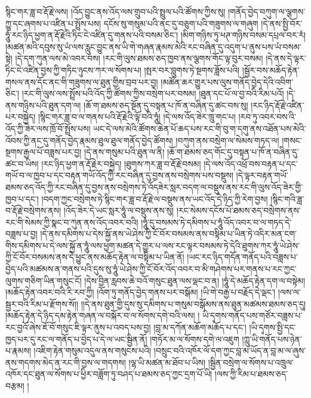 སྙིང་གར་ཟླ་བ་རྡོ་རྗེ་ལས། །འོད་བྱུང་ནས་འོད་ལས་གྲུབ་པའི་སྤྲུལ་པའི་ཚོགས་ཀྱིས་སུ། །གནོད་བྱེད་བཀུག་ལ་ལྕགས་ཀྱུ་དང་ཞགས་པ་འཛིན་པ་སྤྲོས་པས། དངོས་སུ་གསུམ་པའི་ནང་དུ་བཅུག་པའི་གཟུགས་ལ་གཞུག །དེ་ནས་སྤྱི་བོར་ཧཱུཾ་རང་ཉིད་ཕྱག་ན་རྡོ་རྗེའི་ཏིང་ངེ་འཛིན་དུ་གནས་པའི་བསམ་ཅིང་། །མིག་གཉིས་ཏུ་ཕཊ་གཉིས་བསམ་དཔྲལ་བར་རཾ། །མཚན་མའི་དབུས་སུ་ཡཾ་ལས་རླུང་བྱུང་ནས་ཡི་གེ་གཞན་རྣམས་མེའི་རང་བཞིན་དུ་འདུག་པ་ནུས་པས་ཡཾ་བསམ་སྟེ། །དེ་དག་ཀུན་ལས་མེ་འབར་བས། །རང་གི་ལུས་ཐམས་ཅད་ཁྱབ་ནས་ལྕགས་གོང་ལྟ་བུར་བསམ། །དེ་ནས་དེ་ལྟར་ཏིང་ངེ་འཛིན་བྱས་ཀྱི་གཏིང་ཉུངས་ཀར་ལ་སོགས་པ། །སྤར་བར་བླུགས་ཏེ་སྔགས་ཟློས་པའི། །སྦྱོར་བས་མཆོད་རྟེན་གསལ་ནས་དོང་ནང་གི་གཟུགས་ལ་ཐུན་གྱིས་བྲབ་པར་བྱ། །མཚོན་ཆར་གྱུར་པས་ལུས་གནོད་བྱེད་དེའི་འབིག་ཅིང་། །རང་གི་ལུས་ལས་སྤྲོས་པའི་འོད་ཀྱི་ཚོགས་ཀྱིས་བསྲེག་པར་བསམ། །ཐུན་དང་པོ་ལ་བྱ་བའི་རིམ་པའོ། །དེ་ནས་གཉིས་པའི་ཐུན་དག་ལ། །ཆོ་ག་ཐམས་ཅད་སྔོན་དུ་བསྟན་པ་ཁོ་ན་བཞིན་དུ་ཚང་བས་སུ། །རང་ཉིད་རྡོ་རྗེ་འཛིན་པར་བསྐྱེད། །སྙིང་གར་ཟླ་བ་ལ་གནས་པའི་རྡོ་རྗེའི་ལྟོ་བའི་ཧཱུཾ། །དེ་ལས་འོད་ཟེར་ཁྲུ་གང་པ། །རབ་ཏུ་འབར་བས་འི་འོད་ཀྱི་ཟེར་ལས་ཁྲོ་བོ་སྤྲོས་པས། ཡང་དེ་ལས་མེའི་ཚོགས་ཆེན་པོ་ཆད་པས་རང་གི་བུ་ག་དགུ་ནས་འཐོན་པས་མེའི་འོབས་ཀྱི་ནང་དུ་གནོད་བྱེད་རྣམས་ཐུལ་ཐུལ་གནོད་བྱེད་ཚོགས། །བཀུག་ནས་བསྲེག་ལ་སེམས་གཏད་ལ། །གསང་སྔགས་རྒྱལ་པོ་བཟླས་པར་བྱ། །དེ་ནས་གསུམ་པའི་ཐུན་ལ་ནི། །ཆོ་ག་ཐམས་ཅད་གོང་དུ་བསྟན་པ་ཁོ་ན་བཞིན་དུ་ཚང་བ་ཡིས། །རང་ཉིད་ཕྱག་ན་རྡོ་རྗེར་བསྐྱེད། །ཐུགས་ཀར་ཟླ་བ་རྡོ་རྗེ་བསམ། །དེ་ལས་འོད་འཕྲོ་བས་བརྟན་པ་དང་གཡོ་བ་ལ་ཁྱབ་པ་དང་བརྟན་གཡོ་འོད་ཀྱི་རང་བཞིན་དུ་བྱས་ནས་བསྲེགས་པས་བསྡུས། །དེ་ལྟར་བརྟན་གཡོ་ཐམས་ཅད་འོད་ཀྱི་རང་བཞིན་དུ་བྱས་ནས་བསྲེགས་ཏེ་འོདཟེར་སླར་བདག་ལ་བསྡུས་ནས་རང་གི་ལུས་འོད་ཟེར་གྱི་ཁྱབ་པ་དང་། །བདག་ཀྱང་བསྲེགས་ཏེ་སྙིང་གར་ཟླ་བ་རྡོ་རྗེ་ལ་བསྡུས་ནས་ཡང་འོད་དེ་ཉིད་ཀྱི་རེག་བྱས། །སྙིང་གའི་ཟླ་བ་རྡོ་རྗེ་བསྲེགས་ནས། །འོད་ཟེར་དེ་ཡང་སླར་ཧཱུཾ་ལ་བསྡུས་ནས་སུ། །རང་སེམས་དངོས་པོ་ཐམས་ཅད་བསྲེགས་ནས་རང་གི་སེམས་ཀྱི་སྣང་བ་ཀུན་ནས་འོད་འབར་བའི། །ཧཱུཾ་དུ་བསམས་ཏེ་དམིགས་པ་ཧཱུཾ་འོད་འབར་བ་ལ་གཏད་དེ་བཟླས་པ་བྱ། །དེ་ནས་དམིགས་པ་དེས་སྐྱོ་ནས་ཡེ་ཤེས་ཀྱི་ངོ་བོར་བསམས་ནས་བསྟིམ་པ་ཡིན་ཏེ་འདིར་མན་ངག་གིས་དམིགས་པ་དེ་ལས་སྐྱོ་ན་ཧཱུཾ་ལས་ཕྱག་མཚན་དེ་གྱུར་པ་ལས་རང་ལྟར་བསམས་ཏེ་དེའི་ཐུགས་ཀར་ཧཱུཾ་ཡེ་ཤེས་ཀྱི་ངོ་བོར་བསམས་ནས་དེ་ཕྱུང་ནས་མཆོད་རྟེན་ལ་བསྟིམ་པ་ཡིན་ནོ། །ཡང་རང་ཉིད་གདོན་གནོད་པའི་བཟླས་པ་བྱེད་པའི་མཚམས་ན་གནས་པའི་དུས་སུ་ཧཱུཾ་ཡེ་ཤེས་ཀྱི་ངོ་བོར་འོད་འབར་བ་མི་གཤེགས་པར་གནས་པ་རང་ཀྱང་ལུགས་གཅིག་ཡིན་གསུང་ངོ། །དེས་བྱིན་རླབས་ཆེ་བའོ་གསུང་ཐུན་ལས་ལྡང་བ་ན། །ཧཱུཾ་དེ་མཆོད་རྟེན་དག་ལ་བསྟེམ། །མཆོད་རྟེན་འབར་བའི་རི་རབ་ཀྱི། །འོག་ཏུ་གནོད་བྱེད་གནས་པར་བསྒོམ། །ཡི་གེ་བརྒྱ་པ་བརྗོད་དེ་ལྡང་། །ལས་ལ་སྦྱར་བའི་རིམ་པ་རྫོགས་སོ།། །།དེ་ནས་ཐུན་གྱི་དུས་སུ་དམིགས་པ་གསུམ་བསྒོམས་ནས་ཐུན་མཚམས་ཐམས་ཅད་དུ། །མཆོད་རྟེན་དེ་ཉིད་དམ་རྟེན་གཞན་ལ་བསྐོར་བ་ལ་སོགས་དགེ་བའི་ལས། ། ཡི་དྭགས་གནོད་པས་གཙོར་བཟླས་པ་རང་བྱའོ་ཞེས་ཇོ་བོ་གསུང་ཇི་ལྟར་ནུས་པ་འབད་པས་བྱ། །བླ་མ་དཀོན་མཆོག་མཆོད་པ་དང་། །ཡི་དྭགས་སྤྱི་དང་ཁྱད་པར་དུ་རང་ལ་གནོད་པ་བྱེད་པ་དེ་ལ་ཡང་སྦྱིན་ནོ། །གཏོར་མ་ལ་སོགས་དགེ་ལ་འཇུག །ཀླུ་ཡི་གནོད་པས་ཉེན་པ་རྣམས། །འཇིག་རྟེན་གསུམ་འདུལ་ནས་གསུངས་པའི། །བསྲུང་བའི་འཁོར་ལོ་དག་ཀྱང་བླ་མ་ཡོད་ན་བླ་མ་ལ་ཞུས་ནས་གདགས་མེད་ན་རང་གི་བྱས་ལ་གདགས། །ལྷ་ཡི་མཚན་མ་ཐོབ་པ་ཡིས། །སྦྱིན་བསྲེག་ལ་སོགས་པ་འཁྲུལ་འཁོར་དང་ཐུན་ལ་སོགས་པ་ཕྱིར་བཟློག་ཏུ་བཤད་པ་ཐམས་ཅད་ཀྱང་དྲག་པོ་ཡི། །ལས་ཀྱི་རིམ་པ་ཐམས་ཅད་བརྩམ། །
